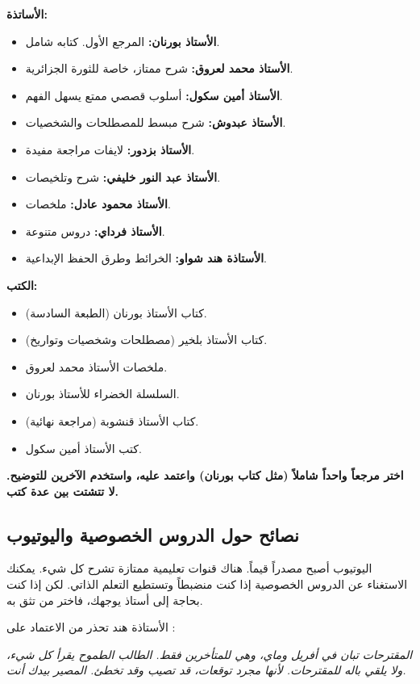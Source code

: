 \documentclass[12pt,a4paper]{book}
\newcommand{\quoteAr}[1]{%
	\begin{myquote}
		\itshape #1
	\end{myquote}
}
\newcommand{\importantAr}[1]{%
	\begin{important}
		\bfseries #1
	\end{important}
}
\begin{document}
	\textbf{الأساتذة:}
	\begin{itemize}
		\item \textbf{الأستاذ بورنان:} المرجع الأول. كتابه شامل.
		\item \textbf{الأستاذ محمد لعروق:} شرح ممتاز، خاصة للثورة الجزائرية.
		\item \textbf{الأستاذ أمين سكول:} أسلوب قصصي ممتع يسهل الفهم.
		\item \textbf{الأستاذ عبدوش:} شرح مبسط للمصطلحات والشخصيات.
		\item \textbf{الأستاذ بزدور:} لايفات مراجعة مفيدة.
		\item \textbf{الأستاذ عبد النور خليفي:} شرح وتلخيصات.
		\item \textbf{الأستاذ محمود عادل:} ملخصات.
		\item \textbf{الأستاذ فرداي:} دروس متنوعة.
		\item \textbf{الأستاذة هند شواو:} الخرائط وطرق الحفظ الإبداعية.
	\end{itemize}
	
	\textbf{الكتب:}
	\begin{itemize}
		\item كتاب الأستاذ بورنان (الطبعة السادسة).
		\item كتاب الأستاذ بلخير (مصطلحات وشخصيات وتواريخ).
		\item ملخصات الأستاذ محمد لعروق.
		\item السلسلة الخضراء للأستاذ بورنان.
		\item كتاب الأستاذ قنشوبة (مراجعة نهائية).
		\item كتب الأستاذ أمين سكول.
	\end{itemize}
	
	\importantAr{اختر مرجعاً واحداً شاملاً (مثل كتاب بورنان) واعتمد عليه، واستخدم الآخرين للتوضيح. لا تتشتت بين عدة كتب.}
	
	\subsection{نصائح حول الدروس الخصوصية واليوتيوب}
	\label{sec:random-tips15}
	
	اليوتيوب أصبح مصدراً قيماً. هناك قنوات تعليمية ممتازة تشرح كل شيء. يمكنك الاستغناء عن الدروس الخصوصية إذا كنت منضبطاً وتستطيع التعلم الذاتي. لكن إذا كنت بحاجة إلى أستاذ يوجهك، فاختر من تثق به.
	
	الأستاذة هند تحذر من الاعتماد على : 
	\quoteAr{المقترحات تبان في أفريل وماي، وهي للمتأخرين فقط. الطالب الطموح يقرأ كل شيء، ولا يلقي باله للمقترحات. لأنها مجرد توقعات، قد تصيب وقد تخطئ. المصير بيدك أنت.}
	
\end{document}
